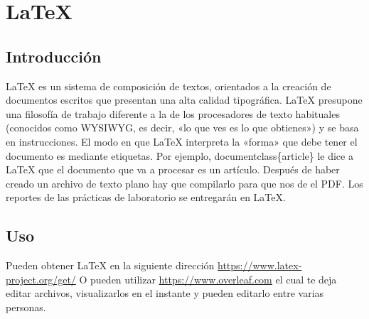 \documentclass[11pt]{article}
\begin{document}
\section{\LaTeX{}}
\label{sec:orgc32527f}
\subsection{Introducción}
\label{sec:org060e55d}
\LaTeX{} es un sistema de composición de textos, orientados a la creación de documentos escritos que presentan una alta calidad tipográfica.
\LaTeX{} presupone una filosofía de trabajo diferente a la de los procesadores de texto habituales (conocidos como WYSIWYG, es decir, «lo que ves es lo que obtienes») y se basa en instrucciones. 
El modo en que \LaTeX{} interpreta la «forma» que debe tener el documento es mediante etiquetas. Por ejemplo, documentclass\{article\} le dice a \LaTeX{} que el documento que va a procesar es un artículo.
Después de haber creado un archivo de texto plano hay que compilarlo para que nos de el PDF.
Los reportes de las prácticas de laboratorio se entregarán en \LaTeX{}.
\subsection{Uso}
\label{sec:orgc6fbe7d}
Pueden obtener \LaTeX{} en la siguiente dirección \url{https://www.latex-project.org/get/}
O pueden utilizar \url{https://www.overleaf.com} el cual te deja editar archivos, 
visualizarlos en el instante y  pueden editarlo entre varias personas.
\end{document}
